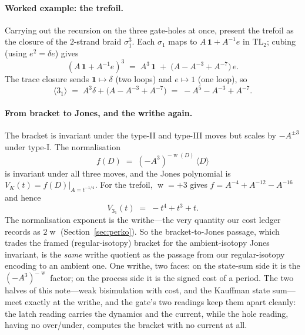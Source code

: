 \documentclass[11pt]{article}
\theoremstyle{definition}
\newcommand{\writhe}{\operatorname{w}}
\begin{document}
\paragraph{Worked example: the trefoil.}
Carrying out the recursion on the three gate-holes at once, present the trefoil as
the closure of the $2$-strand braid $\sigma_1^{3}$. Each $\sigma_1$ maps to
$A\,\mathbf{1}+A^{-1}e$ in $\mathrm{TL}_2$; cubing (using $e^2=\delta e$) gives
\[
(A\,\mathbf{1}+A^{-1}e)^{3} \;=\; A^{3}\,\mathbf{1} \;+\; \bigl(A - A^{-3} + A^{-7}\bigr)\,e .
\]
The trace closure sends $\mathbf{1}\mapsto\delta$ (two loops) and $e\mapsto 1$ (one
loop), so
\[
\langle 3_1\rangle \;=\; A^{3}\delta + \bigl(A - A^{-3}+A^{-7}\bigr)
\;=\; -A^{5} - A^{-3} + A^{-7}.
\]

\paragraph{From bracket to Jones, and the writhe again.}
The bracket is invariant under the type-II and type-III moves but scales by $-A^{\pm3}$
under type-I. The normalisation
\[
f(D) \;=\; (-A^{3})^{-\writhe(D)}\,\langle D\rangle
\]
is invariant under all three moves, and the Jones polynomial is
$V_K(t)=f(D)\big|_{A=t^{-1/4}}$. For the trefoil, $\writhe=+3$ gives
$f=A^{-4}+A^{-12}-A^{-16}$ and hence
\[
V_{3_1}(t) \;=\; -t^{4} + t^{3} + t .
\]
The normalisation exponent is the writhe---the very quantity our cost ledger
records as $2\writhe$ (Section~\ref{sec:perko}). So the bracket-to-Jones passage,
which trades the framed (regular-isotopy) bracket for the ambient-isotopy Jones
invariant, is the \emph{same} writhe quotient as the passage from our
regular-isotopy encoding to an ambient one. One writhe, two faces: on the state-sum
side it is the $(-A^3)^{-\writhe}$ factor; on the process side it is the signed
cost of a period. The two halves of this note---weak bisimulation with cost, and the
Kauffman state sum---meet exactly at the writhe, and the gate's two readings keep
them apart cleanly: the latch reading carries the dynamics and the current, while
the hole reading, having no over/under, computes the bracket with no current at
all.
\end{document}
